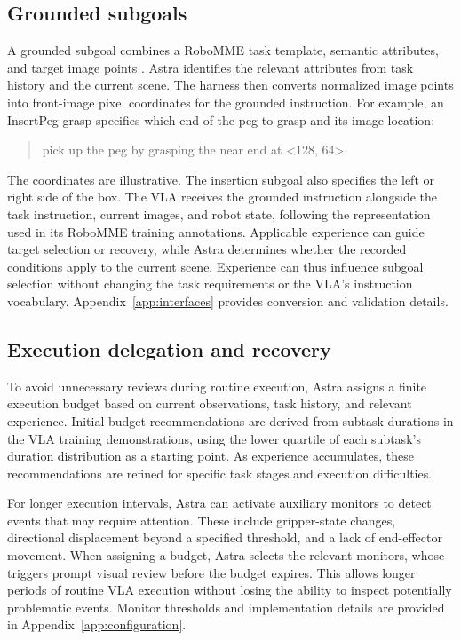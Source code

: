 \subsection{Grounded subgoals}

A grounded subgoal combines a RoboMME task template, semantic attributes, and target image points . Astra identifies the relevant attributes from task history and the current scene. The harness then converts normalized image points into front-image pixel coordinates for the grounded instruction. For example, an InsertPeg grasp specifies which end of the peg to grasp and its image location:

\begin{quote}
\small\ttfamily\raggedright
pick up the peg by grasping the near end at <128, 64>
\end{quote}

The coordinates are illustrative. The insertion subgoal also specifies the left or right side of the box. The VLA receives the grounded instruction alongside the task instruction, current images, and robot state, following the representation used in its RoboMME training annotations. Applicable experience can guide target selection or recovery, while Astra determines whether the recorded conditions apply to the current scene. Experience can thus influence subgoal selection without changing the task requirements or the VLA's instruction vocabulary. Appendix~\ref{app:interfaces} provides conversion and validation details.

\subsection{Execution delegation and recovery}

To avoid unnecessary reviews during routine execution, Astra assigns a finite execution budget based on current observations, task history, and relevant experience. Initial budget recommendations are derived from subtask durations in the VLA training demonstrations, using the lower quartile of each subtask's duration distribution as a starting point. As experience accumulates, these recommendations are refined for specific task stages and execution difficulties.

For longer execution intervals, Astra can activate auxiliary monitors to detect events that may require attention. These include gripper-state changes, directional displacement beyond a specified threshold, and a lack of end-effector movement. When assigning a budget, Astra selects the relevant monitors, whose triggers prompt visual review before the budget expires. This allows longer periods of routine VLA execution without losing the ability to inspect potentially problematic events. Monitor thresholds and implementation details are provided in Appendix~\ref{app:configuration}.

